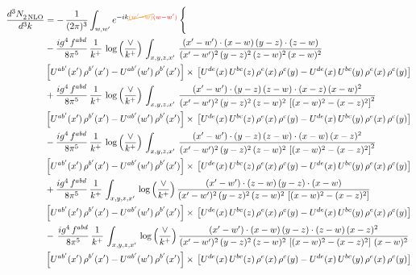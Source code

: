 \documentclass[9pt]{article}
\numberwithin{equation}{section}
\begin{document}
\begin{align}
   \frac{d^{3}N_{2\,\rm NLO}^{\rm}}{d^{3}k}  & =  -\,\frac{1}{(2\pi)^{3}}  \int_{w, w^\prime} e^{-ik{\color{orange}\cancel{(w^\prime-w)}}{\color{red}(w-w^\prime)}}\, \Bigg\{\notag \\
& -\frac{ig^{4}\, f^{abd}}{8\pi^{5}}\, \frac{1}{k^{+}}\, \log{\left(\frac{\vee}{k^{+}}\right)}\,\int_{x,y,z,x'}\,\frac{(x'-w')\cdot (x-w)\, (y-z)\cdot (z-w)}{(x'-w')^{2}\, (y-z)^{2}\, (z-w)^{2}\,(x-w)^{2}}\, \notag \\ & \left[U^{ab'}(x')\,\rho^{b'}(x')-U^{ab'}(w')\, \rho^{b'}(x')\right]\times\,\left[U^{de}(x)\,U^{bc}(z)\, \rho^{e}(x)\,\rho^{c}(y)-U^{de}(x)\,U^{bc}(y)\,\rho^{e}(x)\,\rho^{c}(y)\right] \notag \\
&  + \frac{ig^{4}\, f^{abd}}{8\pi^{5}}\, \frac{1}{k^{+}}\,\log{\left(\frac{\vee}{k^{+}}\right)}\, \int_{x,y,z,x'}\,\frac{(x'-w')\cdot  (y-z)\, (z-w)\cdot (x-z)\, (x-w)^{2}}{(x'-w')^{2}\, (y-z)^{2}\, (z-w)^{2}\,\left[(x-w)^{2}-(x-z)^{2}\right]^{2}}\, \notag \\ & \left[U^{ab'}(x')\,\rho^{b'}(x')-U^{ab'}(w')\, \rho^{b'}(x')\right]\times\,\left[U^{de}(x)\,U^{bc}(z)\, \rho^{e}(x)\,\rho^{c}(y)-U^{de}(x)\,U^{bc}(y)\,\rho^{e}(x)\,\rho^{c}(y)\right] \notag \\
&   - \frac{ig^{4}\, f^{abd}}{8\pi^{5}}\, \frac{1}{k^{+}}\,\log{\left(\frac{\vee}{k^{+}}\right)}\, \int_{x,y,z,x'}\,\frac{(x'-w')\cdot  (y-z)\, (z-w)\cdot (x-w)\, (x-z)^{2}}{(x'-w')^{2}\, (y-z)^{2}\, (z-w)^{2}\,\left[(x-w)^{2}-(x-z)^{2}\right]^{2}}\, \notag \\ & \left[U^{ab'}(x')\,\rho^{b'}(x')-U^{ab'}(w')\, \rho^{b'}(x')\right]\times\,\left[U^{de}(x)\,U^{bc}(z)\, \rho^{e}(x)\,\rho^{c}(y)-U^{de}(x)\,U^{bc}(y)\,\rho^{e}(x)\,\rho^{c}(y)\right] \notag \\
&  + \frac{ig^{4}\, f^{abd}}{8\pi^{5}}\, \frac{1}{k^{+}}\, \int_{x,y,z,x'}\,\log{\left(\frac{\vee}{k^{+}}\right)}\,\frac{(x'-w')\cdot (z-w)\, (y-z)\cdot (x-w)}{(x'-w')^{2}\, (y-z)^{2}\, (z-w)^{2}\,\left[(x-w)^{2}-(x-z)^{2}\right]}\, \notag \\ & \left[U^{ab'}(x')\,\rho^{b'}(x')-U^{ab'}(w')\, \rho^{b'}(x')\right]\times\,\left[U^{de}(x)\,U^{bc}(z)\, \rho^{e}(x)\,\rho^{c}(y)-U^{de}(x)\,U^{bc}(y)\,\rho^{e}(x)\,\rho^{c}(y)\right] \notag \\
& -\,\frac{ig^{4}\, f^{abd}}{8\pi^{5}}\, \frac{1}{k^{+}}\, \int_{x,y,z,x'}\,\log{\left(\frac{\vee}{k^{+}}\right)}\,\frac{(x'-w')\cdot (x-w)\, (y-z)\cdot(z-w)\,(x-z)^{2}}{(x'-w')^{2}\, (y-z)^{2}\, (z-w)^{2}\,\left[(x-w)^{2}-(x-z)^{2}\right]\,(x-w)^{2}}\, \notag \\ & \left[U^{ab'}(x')\,\rho^{b'}(x')-U^{ab'}(w')\, \rho^{b'}(x')\right]\times\,\left[U^{de}(x)\,U^{bc}(z)\, \rho^{e}(x)\,\rho^{c}(y)-U^{de}(x)\,U^{bc}(y)\,\rho^{e}(x)\,\rho^{c}(y)\right] \notag \\

\end{align}
\end{document}
